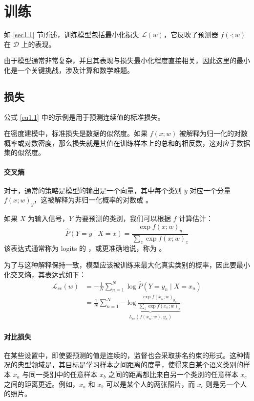 \chapter{训练}\label{ch3}

如 \ref{sec1.1} 节所述，训练模型包括最小化损失 $\mathcal{L}(w)$，它反映了预测器 $f(\cdot;w)$ 在 $\mathcal{D}$ 上的表现。

由于模型通常非常复杂，并且其表现与损失最小化程度直接相关，因此这里的最小化是一个关键挑战，涉及计算和数学难题。

\section{损失}\label{sec3.1}

公式 \ref{eq1.1} 中的示例是用于预测连续值的标准损失。

在密度建模中，标准损失是数据的似然度。如果 $f(x;w)$ 被解释为归一化的对数概率或对数密度，那么损失就是其值在训练样本上的总和的相反数，这对应于数据集的似然度。

\subsubsection*{交叉熵}

对于，通常的策略是模型的输出是一个向量，其中每个类别 $y$ 对应一个分量 $f(x;w)_y$，这被解释为非归一化概率的对数或 。

如果 $X$ 为输入信号，$Y$ 为要预测的类别，我们可以根据 $f$ 计算估计：
\[\hat{P}(Y=y \mid X=x) = \frac{\exp f(x;w)_y}{\sum_{z}\exp f(x;w)_z}\]
该表达式通常称为 logits 的 ，或更准确地说，称为 。

为了与这种解释保持一致，模型应该被训练来最大化真实类别的概率，因此要最小化交叉熵，其表达式如下：
\begin{align*}
    \mathcal{L}_{ce}(w) &= -\frac{1}{N}\sum_{n=1}^{N} \log \hat{P}(Y=y_n \mid X=x_n) \\
    &= \frac{1}{N}\sum_{n=1}^{N} \underbrace{-\log \frac{\exp f(x_n;w)_{y_n}}{\sum_{z}\exp f(x_n;w)_z}}_{L_{ce}(f(x_n;w),y_n)}
\end{align*}

\subsubsection*{对比损失}

在某些设置中，即使要预测的值是连续的，监督也会采取排名约束的形式。这种情况的典型领域是，其目标是学习样本之间距离的度量，使得来自某个语义类别的样本 $x_a$ 与同一类别中的任意样本 $x_b$ 之间的距离都比来自另一个类别的任意样本 $x_c$ 之间的距离更近。例如，$x_a$ 和 $x_b$ 可以是某个人的两张照片，而 $x_c$ 则是另一个人的照片。

